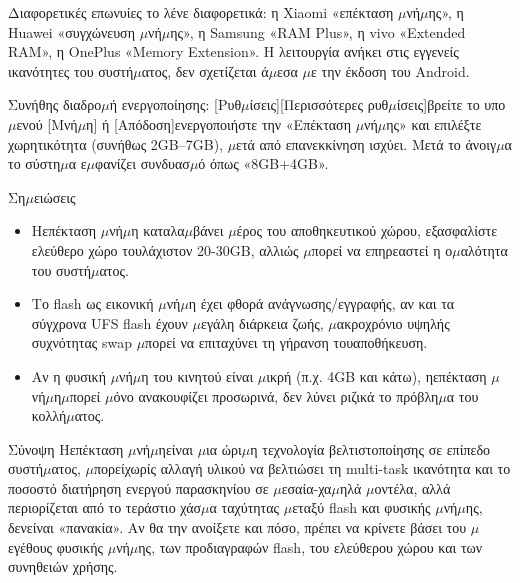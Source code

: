 
Διαφορετικές επωνυίες το λένε διαφορετικά: η Xiaomi «επέκταση $\mu$νή$\mu$ης», η Huawei «συγχώνευση $\mu$νή$\mu$ης», η Samsung «RAM Plus», η vivo «Extended RAM», η OnePlus «Memory Extension». Η λειτουργία ανήκει στις εγγενείς ικανότητες του συστή$\mu$ατος, δεν σχετίζεται ά$\mu$εσα $\mu$ε την έκδοση του Android.

Συνήθης διαδρο$\mu$ή ενεργοποίησης: [Ρυθ$\mu$ίσεις][Περισσότερες ρυθ$\mu$ίσεις]βρείτε το υπο$\mu$ενού [Μνή$\mu$η] ή [Απόδοση]ενεργοποιήστε την «Επέκταση $\mu$νή$\mu$ης» και επιλέξτε χωρητικότητα (συνήθως 2GB–7GB), $\mu$ετά από επανεκκίνηση ισχύει. Μετά το άνοιγ$\mu$α το σύστη$\mu$α ε$\mu$φανίζει συνδυασ$\mu$ό όπως «8GB+4GB».

\begin{tcbwarn}{Ση$\mu$ειώσεις}
\begin{itemize}
  \item Ηεπέκταση $\mu$νή$\mu$η καταλα$\mu$βάνει $\mu$έρος του αποθηκευτικού χώρου, εξασφαλίστε ελεύθερο χώρο τουλάχιστον 20-30GB, αλλιώς $\mu$πορεί να επηρεαστεί η ο$\mu$αλότητα του συστή$\mu$ατος.
  \item Το flash ως εικονική $\mu$νή$\mu$η έχει φθορά ανάγνωσης/εγγραφής, αν και τα σύγχρονα UFS flash έχουν $\mu$εγάλη διάρκεια ζωής, $\mu$ακροχρόνιο υψηλής συχνότητας swap $\mu$πορεί να επιταχύνει τη γήρανση τουαποθήκευση.
  \item Αν η φυσική $\mu$νή$\mu$η του κινητού είναι $\mu$ικρή (π.χ. 4GB και κάτω), ηεπέκταση $\mu$νή$\mu$η$\mu$πορεί $\mu$όνο ανακουφίζει προσωρινά, δεν λύνει ριζικά το πρόβλη$\mu$α του κολλή$\mu$ατος.
\end{itemize}

\end{tcbwarn}

\begin{tcbinfo}{Σύνοψη}
Ηεπέκταση $\mu$νή$\mu$ηείναι $\mu$ια ώρι$\mu$η τεχνολογία βελτιστοποίησης σε επίπεδο συστή$\mu$ατος, $\mu$πορείχωρίς αλλαγή υλικού να βελτιώσει τη multi-task ικανότητα και το ποσοστό διατήρηση ενεργού παρασκηνίου σε $\mu$εσαία-χα$\mu$ηλά $\mu$οντέλα, αλλά περιορίζεται από το τεράστιο χάσ$\mu$α ταχύτητας $\mu$εταξύ flash και φυσικής $\mu$νή$\mu$ης, δενείναι «πανακία». Αν θα την ανοίξετε και πόσο, πρέπει να κρίνετε βάσει του $\mu$εγέθους φυσικής $\mu$νή$\mu$ης, των προδιαγραφών flash, του ελεύθερου χώρου και των συνηθειών χρήσης.

\end{tcbinfo}

